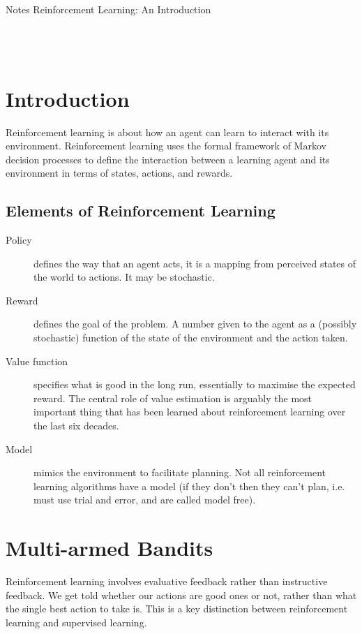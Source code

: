 



{\huge Notes} \hfill {\huge Reinforcement Learning: An Introduction}\\
\Rule\\
\tableofcontents
\mbox{}\\
\Rule
\mbox{}\\


\clearpage
\section{Introduction}
Reinforcement learning is about how an agent can learn to interact with its environment. Reinforcement learning uses the formal framework of Markov decision processes to define the interaction between a learning agent and its environment in terms of states, actions, and rewards.

\setcounter{subsection}{2}
\subsection{Elements of Reinforcement Learning}
\begin{description}
     \item[Policy] defines the way that an agent acts, it is a mapping from perceived states of the world to actions. It may be stochastic.
     \item[Reward] defines the goal of the problem. A number given to the agent as a (possibly stochastic) function of the state of the environment and the action taken.
     \item[Value function] specifies what is good in the long run, essentially to maximise the expected reward. The central role of value estimation is arguably the most important thing that has been learned about reinforcement learning over the last six decades.
     \item[Model] mimics the environment to facilitate planning. Not all reinforcement learning algorithms have a model (if they don't then they can't plan, i.e. must use trial and error, and are called model free).
\end{description}

\clearpage
\section{Multi-armed Bandits}
Reinforcement learning involves evaluative feedback rather than instructive feedback. We get told whether our actions are good ones or not, rather than what the single best action to take is. This is a key distinction between reinforcement learning and supervised learning.


